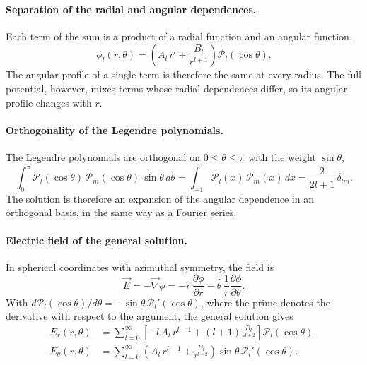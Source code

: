 \paragraph{Separation of the radial and angular dependences.}
Each term of the sum is a product of a radial function and an angular function,
\begin{equation*}
    \phi_l(r,\theta) = \left(A_l\,r^l + \frac{B_l}{r^{l+1}}\right)\mathcal{P}_l(\cos\theta).
\end{equation*}
The angular profile of a single term is therefore the same at every radius. The full potential, however, mixes terms whose radial dependences differ, so its angular profile changes with $r$.

\paragraph{Orthogonality of the Legendre polynomials.}
The Legendre polynomials are orthogonal on $0 \le \theta \le \pi$ with the weight $\sin\theta$,
\begin{equation*}
    \int_0^\pi \mathcal{P}_l(\cos\theta)\,\mathcal{P}_m(\cos\theta)\,\sin\theta\,d\theta
    = \int_{-1}^{1}\mathcal{P}_l(x)\,\mathcal{P}_m(x)\,dx
    = \frac{2}{2l+1}\,\delta_{lm}.
\end{equation*}
The solution is therefore an expansion of the angular dependence in an orthogonal basis, in the same way as a Fourier series.

\paragraph{Electric field of the general solution.}
In spherical coordinates with azimuthal symmetry, the field is
\begin{equation*}
    \vec E = -\vec\nabla\phi = -\hat r\,\frac{\partial\phi}{\partial r} - \hat\theta\,\frac{1}{r}\frac{\partial\phi}{\partial\theta}.
\end{equation*}
With $d\mathcal{P}_l(\cos\theta)/d\theta = -\sin\theta\,\mathcal{P}_l'(\cos\theta)$, where the prime denotes the derivative with respect to the argument, the general solution gives
\begin{equation}
    \boxed{
    \begin{aligned}
    E_r(r,\theta) &= \sum_{l=0}^{\infty}\left[-l\,A_l\,r^{l-1} + (l+1)\frac{B_l}{r^{l+2}}\right]\mathcal{P}_l(\cos\theta),\\
    E_\theta(r,\theta) &= \sum_{l=0}^{\infty}\left(A_l\,r^{l-1} + \frac{B_l}{r^{l+2}}\right)\sin\theta\,\mathcal{P}_l'(\cos\theta).
    \end{aligned}
    }
\end{equation}

